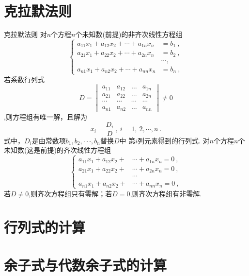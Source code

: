 \documentclass[8pt a4paper, oneside, UTF8]{ctexbook}
\begin{document}
\begin{sloppypar}
    \section{克拉默法则}
    \begin{defn}{克拉默法则}{}
        对$n$个方程$n$个未知数(前提)的非齐次线性方程组
        $$
            \begin{cases}
                a_{11}x_1+a_{12}x_2+\cdots+a_{1n}x_n & =b_1\:,  \\
                a_{21}x_1+a_{22}x_2+\cdots+a_{2n}x_n & =b_2\:,  \\
                                                     & \cdots , \\
                a_{n1}x_1+a_{n2}x_2+\cdots+a_{nn}x_n & =b_n\:,
            \end{cases}
        $$
        若系数行列式
        $$
            D=\begin{vmatrix}
                a_{11} & a_{12} & \ldots & a_{1n} \\
                a_{21} & a_{22} & \ldots & a_{2n} \\
                \cdots & \cdots & \cdots & \cdots \\
                a_{n1} & a_{n2} & \ldots & a_{nn}
            \end{vmatrix} \neq 0
        $$
        ,则方程组有唯一解，且解为
        $$
            x_i=\frac{D_i}{D}\:,\:i=1,\:2,\cdots,n\:.
        $$
        式中，$D_i$是由常数项$b_1, b_2, \cdotp \cdotp \cdotp , b_n$替换$D$中 第$i$列元素得到的行列式.
        对$n$个方程$n$个未知数(这是前提)的齐次线性方程组
        $$
            \begin{cases}
                a_{11}x_1+a_{12}x_2+ & \cdots+a_{1n}x_n=0\:, \\
                a_{21}x_1+a_{22}x_2+ & \cdots+a_{2n}x_n=0\:, \\
                                     & \cdots
                \\a_{n1}x_1+a_{n2}x_2+&\cdots+a_{nn}x_n=0\:,
            \end{cases}
        $$
        若$D\neq0$,则齐次方程组只有零解；若$D=0$,则齐次方程组有非零解.
    \end{defn}
    \section{行列式的计算}

    \section{余子式与代数余子式的计算}

    \ifx\allfiles\undefined
\end{sloppypar}
\end{document}
